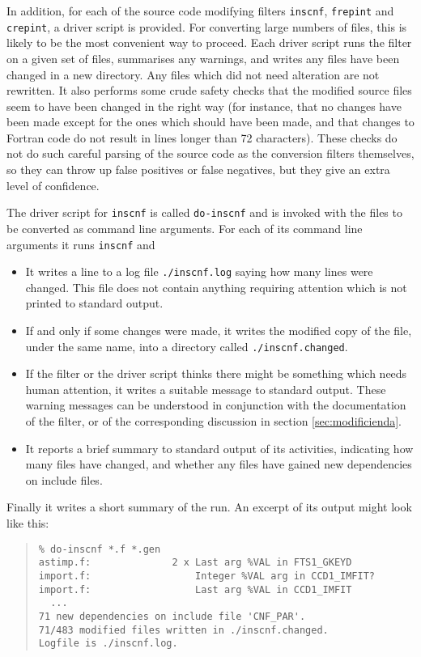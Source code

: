 \documentclass[twoside,11pt]{article}
\newcommand{\htmlref}[2]{#1}
\renewcommand{\_}{\texttt{\symbol{95}}}
\newcommand{\xroutine}[1]{\htmlref{{\tt #1}}{#1}}
\newcommand{\xdofilter}[1]{\htmlref{{\tt do-#1}}{do-xxx}}
\newcommand{\file}[1]{{\tt #1}}
\newenvironment{squote}{\begin{quote}\begin{small}}{\end{small}\end{quote}}
\begin{document}
In addition, for each of the source code modifying filters
\xroutine{inscnf}, \xroutine{frepint} and \xroutine{crepint}, 
a driver script is provided. 
For converting large numbers of files, this is likely to be the 
most convenient way to proceed.  Each driver script 
runs the filter on a given set of files, summarises any warnings, and
writes any files have been changed in a new directory.
Any files which did not need alteration are not rewritten.
It also performs some crude safety checks that the modified source
files seem to have been changed in the right way (for instance, that
no changes have been made except for the ones which should have been
made, and that changes to Fortran code do not result in lines longer
than 72 characters).  
These checks do not do such careful parsing
of the source code as the conversion filters themselves, 
so they can throw up false positives or false negatives, but they give 
an extra level of confidence.

The driver script for \xroutine{inscnf} is called \xdofilter{inscnf}
and is invoked with the files to be converted as command line arguments.
For each of its command line arguments it runs \xroutine{inscnf} and
\begin{itemize}
\item It writes a line to a log file \file{./inscnf.log} 
      saying how many lines were changed.  This file does not contain
      anything requiring attention which is not printed to standard output.
\item If and only if some changes were made, it writes the modified copy
      of the file, under the same name, 
      into a directory called \file{./inscnf.changed}.
\item If the filter or the driver script thinks there might be something 
      which needs human attention, it writes a suitable message to standard
      output.  These warning messages can be understood in conjunction 
      with the documentation of the filter, or of the corresponding 
      discussion in section \ref{sec:modificienda}.
\item It reports a brief summary to standard output of its activities,
      indicating how many files have changed, and whether any files have
      gained new dependencies on include files.
\end{itemize}
Finally it writes a short summary of the run.
An excerpt of its output might look like this:
\begin{squote}
\begin{verbatim}
% do-inscnf *.f *.gen
astimp.f:              2 x Last arg %VAL in FTS1_GKEYD
import.f:                  Integer %VAL arg in CCD1_IMFIT?
import.f:                  Last arg %VAL in CCD1_IMFIT
  ...
71 new dependencies on include file 'CNF_PAR'.
71/483 modified files written in ./inscnf.changed.
Logfile is ./inscnf.log.
\end{verbatim}
\end{squote}
\end{document}
